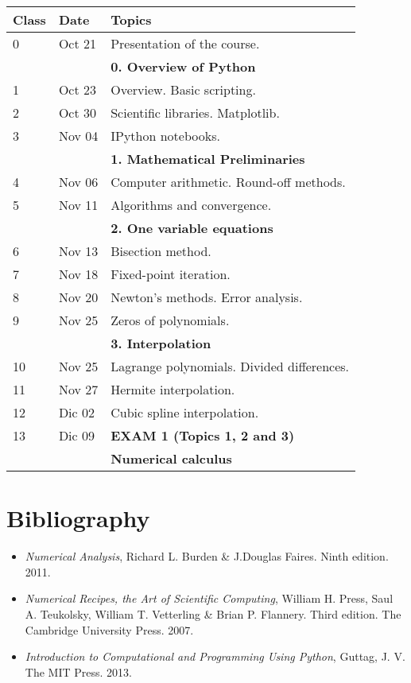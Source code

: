 \documentclass[a4,useAMS,usenatbib,usegraphicx,12pt]{article}
\begin{document}
\begin{table}[h]
\begin{flushleft}
\begin{center}
  \begin{tabular}{l  l  l} \hline\hline
	\centering\textbf{Class} & \textbf{Date} & \textbf{Topics} \\ \hline
	0 & Oct 21& Presentation of the course. \\
	& & \textbf{0. Overview of Python} \\
	1 & Oct 23& Overview. Basic scripting. \\
	2 & Oct 30& Scientific libraries. Matplotlib. \\
	3 & Nov 04& IPython notebooks. \\
	& & \textbf{1. Mathematical Preliminaries} \\
	4 & Nov 06& Computer arithmetic. Round-off methods. \\
	5 & Nov 11& Algorithms and convergence. \\
	& & \textbf{2. One variable equations} \\
	6 & Nov 13& Bisection method. \\
	7 & Nov 18& Fixed-point iteration. \\
	8 & Nov 20& Newton's methods. Error analysis. \\
	9 & Nov 25& Zeros of polynomials. \\
	& & \textbf{3. Interpolation} \\
	10 & Nov 25& Lagrange polynomials. Divided differences. \\
	11 & Nov 27& Hermite interpolation. \\
	12 & Dic 02& Cubic spline interpolation. \\
	13 & Dic 09& \textbf{EXAM 1 (Topics 1, 2 and 3)} \\ \hline
	& & \textbf{Numerical calculus} \\
	\hline\hline
  \end{tabular}  
\end{center}
\end{flushleft}
\end{table}

\section*{Bibliography}
\begin{itemize}
\item \textit{Numerical Analysis}, Richard L. Burden \& J.Douglas Faires. Ninth edition. 2011.
\item \textit{Numerical Recipes, the Art of Scientific Computing}, William H. Press, Saul A. Teukolsky,
William T. Vetterling \& Brian P. Flannery. Third edition. The Cambridge University Press. 2007.
\item \textit{Introduction to Computational and Programming Using Python}, Guttag, J. V. 
The MIT Press. 2013.
\end{itemize}

\end{document}
